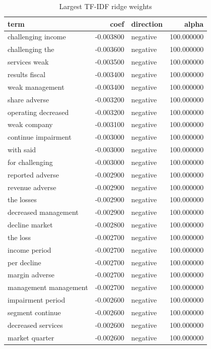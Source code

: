 \begin{table}
\caption{Largest TF-IDF ridge weights}
\label{tab:t7_tfidf_top_terms}
\begin{tabular}{lrlr}
\toprule
term & coef & direction & alpha \\
\midrule
challenging income & -0.003800 & negative & 100.000000 \\
challenging the & -0.003600 & negative & 100.000000 \\
services weak & -0.003500 & negative & 100.000000 \\
results fiscal & -0.003400 & negative & 100.000000 \\
weak management & -0.003400 & negative & 100.000000 \\
share adverse & -0.003200 & negative & 100.000000 \\
operating decreased & -0.003200 & negative & 100.000000 \\
weak company & -0.003100 & negative & 100.000000 \\
continue impairment & -0.003000 & negative & 100.000000 \\
with said & -0.003000 & negative & 100.000000 \\
for challenging & -0.003000 & negative & 100.000000 \\
reported adverse & -0.002900 & negative & 100.000000 \\
revenue adverse & -0.002900 & negative & 100.000000 \\
the losses & -0.002900 & negative & 100.000000 \\
decreased management & -0.002900 & negative & 100.000000 \\
decline market & -0.002800 & negative & 100.000000 \\
the loss & -0.002700 & negative & 100.000000 \\
income period & -0.002700 & negative & 100.000000 \\
per decline & -0.002700 & negative & 100.000000 \\
margin adverse & -0.002700 & negative & 100.000000 \\
management management & -0.002700 & negative & 100.000000 \\
impairment period & -0.002600 & negative & 100.000000 \\
segment continue & -0.002600 & negative & 100.000000 \\
decreased services & -0.002600 & negative & 100.000000 \\
market quarter & -0.002600 & negative & 100.000000 \\

\end{tabular}
\end{table}
